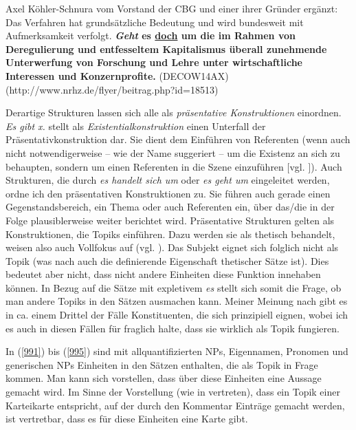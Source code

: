 {\begin{exe}
	\ex\label{990} 
	\scriptsize
	Axel Köhler-Schnura vom Vorstand der CBG und einer ihrer Gründer ergänzt: \glqq Das Verfahren hat grundsätzliche Bedeutung und wird bundesweit mit 			Aufmerksamkeit verfolgt. \textbf{\textit{Geht} es \underline{doch} um die im Rahmen von Deregulierung und entfesseltem Kapitalismus überall zunehmende 		Unterwerfung von Forschung und Lehre unter wirtschaftliche Interessen und Konzernprofite.}\grqq{}
	\hfill\hbox {(DECOW14AX)}
	\newline
	\hbox{}\hfill\hbox{(http://www.nrhz.de/flyer/beitrag.php?id=18513)}
\end{exe}						                                      
Derartige Strukturen lassen sich alle als \textit{präsentative Konstruktionen}  einordnen. \textit{Es gibt x.} stellt als \textit{Existentialkonstruktion}  einen Unterfall der Präsentativkonstruktion dar. Sie dient dem Einführen von Referenten (wenn auch nicht notwendigerweise – wie der Name suggeriert – um die Existenz an sich zu behaupten, sondern um einen Referenten in die Szene einzuführen $[$vgl. \citealt[179]{Lambrecht1994}$]$). Auch Strukturen, die durch \textit{es handelt sich um} oder \textit{es geht um} eingeleitet werden, ordne ich den präsentativen Konstruktionen zu. Sie führen auch gerade einen Gegenstandsbereich, ein Thema oder auch Referenten ein, über das/die in der Folge plausiblerweise weiter berichtet wird. Präsentative Strukturen gelten als Konstruktionen, die Topiks einführen. Dazu werden sie als thetisch  behandelt, weisen also auch Vollfokus  auf (vgl. \citealt[144, 177]{Lambrecht1994}). Das Subjekt eignet sich folglich nicht als Topik (was nach \citealt[144-145]{Lambrecht1994} auch die definierende Eigenschaft thetischer Sätze ist). Dies bedeutet aber nicht, dass nicht andere Einheiten diese Funktion innehaben können. In Bezug auf die Sätze mit expletivem \textit{es} stellt sich somit die Frage, ob man andere Topiks in den Sätzen ausmachen kann. Meiner Meinung nach gibt es in ca. einem Drittel der Fälle Konstituenten, die sich prinzipiell eignen, wobei ich es auch in diesen Fällen für fraglich halte, dass sie wirklich als Topik fungieren.

In (\ref{991}) bis (\ref{995}) sind mit allquantifizierten NPs, Eigennamen, Pronomen und generischen NPs Einheiten in den Sätzen enthalten, die als Topik in Frage kommen. Man kann sich vorstellen, dass über diese Einheiten eine Aussage gemacht wird. Im Sinne der Vorstellung (wie in \citealt{Reinhart1981} vertreten), dass ein Topik einer Karteikarte entspricht, auf der durch den Kommentar Einträge gemacht werden, ist vertretbar, dass es für diese Einheiten eine Karte gibt.

}
